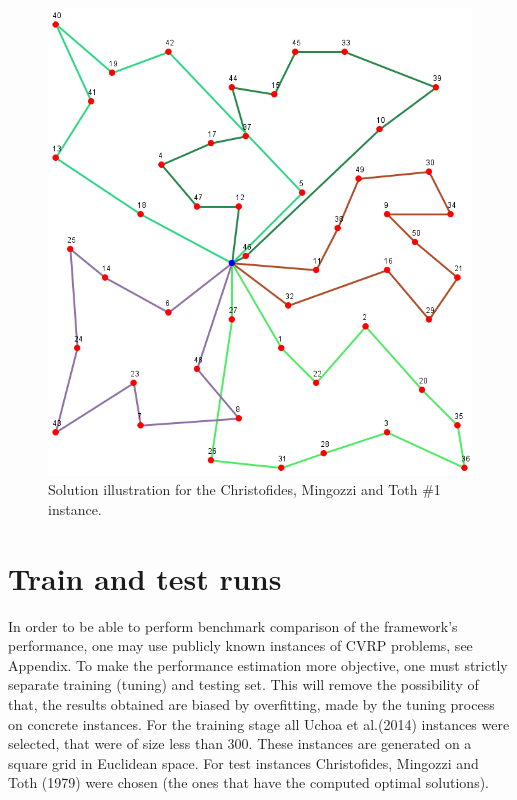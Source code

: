 \documentclass[12pt,a4paper,oneside]{book}
\begin{document}
\begin{figure}[h]
  \centering
    \includegraphics[scale=0.61]{CMT1.PNG}
  \caption{Solution illustration for the Christofides, Mingozzi and Toth \#1 instance.}
  \label{fig:cmt1-illustration}
\end{figure}

\section{Train and test runs}

In order to be able to perform benchmark comparison of the framework's performance, one may use publicly known instances of CVRP problems, see Appendix. To make the performance estimation more objective, one must strictly separate training (tuning) and testing set. This will remove the possibility of that, the results obtained are biased by overfitting, made by the tuning process on concrete instances. For the training stage all Uchoa et al.(2014) instances were selected, that were of size less than 300. These instances are generated on a square grid in Euclidean space. For test instances Christofides, Mingozzi and Toth (1979) were chosen (the ones that have the computed optimal solutions).
\end{document}
